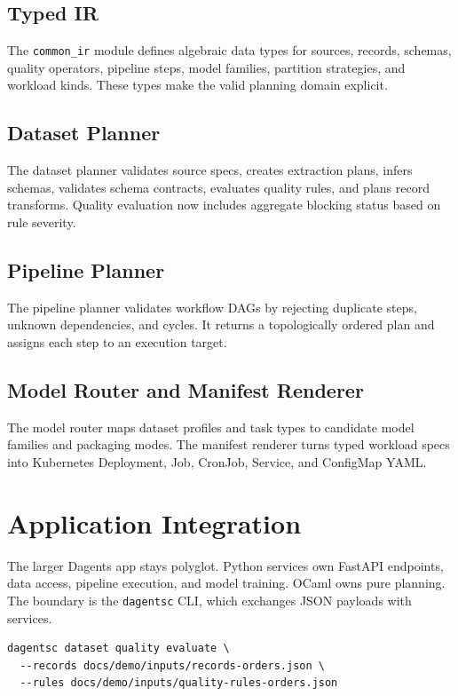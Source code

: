 \documentclass[conference]{IEEEtran}
\begin{document}
\subsection{Typed IR}

The \texttt{common\_ir} module defines algebraic data types for sources,
records, schemas, quality operators, pipeline steps, model families, partition
strategies, and workload kinds. These types make the valid planning domain
explicit.

\subsection{Dataset Planner}

The dataset planner validates source specs, creates extraction plans, infers
schemas, validates schema contracts, evaluates quality rules, and plans record
transforms. Quality evaluation now includes aggregate blocking status based on
rule severity.

\subsection{Pipeline Planner}

The pipeline planner validates workflow DAGs by rejecting duplicate steps,
unknown dependencies, and cycles. It returns a topologically ordered plan and
assigns each step to an execution target.

\subsection{Model Router and Manifest Renderer}

The model router maps dataset profiles and task types to candidate model
families and packaging modes. The manifest renderer turns typed workload specs
into Kubernetes Deployment, Job, CronJob, Service, and ConfigMap YAML.

\section{Application Integration}

The larger Dagents app stays polyglot. Python services own FastAPI endpoints,
data access, pipeline execution, and model training. OCaml owns pure planning.
The boundary is the \texttt{dagentsc} CLI, which exchanges JSON payloads with
services.

\begin{lstlisting}[style=demostyle]
dagentsc dataset quality evaluate \
  --records docs/demo/inputs/records-orders.json \
  --rules docs/demo/inputs/quality-rules-orders.json
\end{lstlisting}
\end{document}
